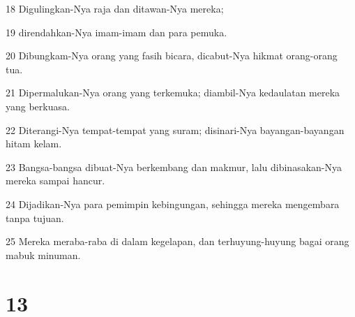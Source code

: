 \par 18 Digulingkan-Nya raja dan ditawan-Nya mereka;
\par 19 direndahkan-Nya imam-imam dan para pemuka.
\par 20 Dibungkam-Nya orang yang fasih bicara, dicabut-Nya hikmat orang-orang tua.
\par 21 Dipermalukan-Nya orang yang terkemuka; diambil-Nya kedaulatan mereka yang berkuasa.
\par 22 Diterangi-Nya tempat-tempat yang suram; disinari-Nya bayangan-bayangan hitam kelam.
\par 23 Bangsa-bangsa dibuat-Nya berkembang dan makmur, lalu dibinasakan-Nya mereka sampai hancur.
\par 24 Dijadikan-Nya para pemimpin kebingungan, sehingga mereka mengembara tanpa tujuan.
\par 25 Mereka meraba-raba di dalam kegelapan, dan terhuyung-huyung bagai orang mabuk minuman.

\chapter{13}

